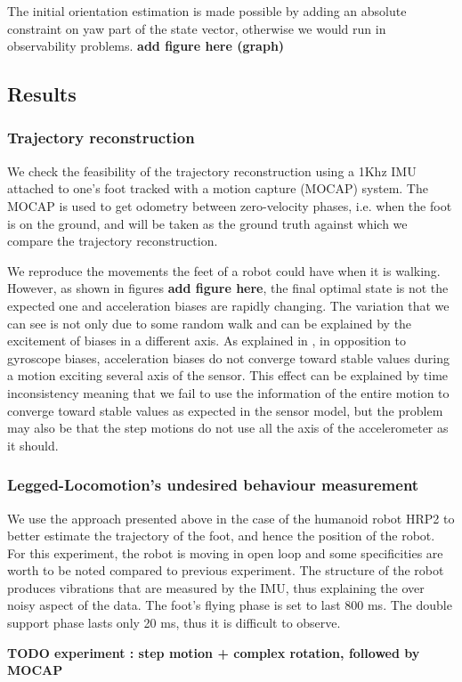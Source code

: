 The initial orientation estimation is made possible by adding an absolute constraint on yaw part of the state vector, otherwise we would run in observability problems. \textbf{add figure here (graph)}

\subsection{Results}
\subsubsection{Trajectory reconstruction}

We check the feasibility of the trajectory reconstruction using a 1Khz IMU attached to one's foot tracked with a motion capture (MOCAP) system. The MOCAP is used to get odometry between zero-velocity phases, i.e. when the foot is on the ground,
and will be taken as the ground truth against which we compare the trajectory reconstruction.

We reproduce the movements the feet of a robot could have when it is walking. However, as shown in figures \textbf{add figure here}, the final optimal state
is not the expected one and acceleration biases are rapidly changing. The variation that we can see is not only due to some random walk and can be explained by the excitement of biases in a different axis.
As explained in \cite{roussillon2011rt}, in opposition to gyroscope biases, acceleration biases do not converge toward stable values during a motion exciting several axis of the sensor. 
This effect can be explained by time inconsistency meaning that we fail
to use the information of the entire motion to converge toward stable values as expected in the sensor model, but the problem may also be that the step motions do not use all the axis of the accelerometer as it should.

\subsubsection{Legged-Locomotion's undesired behaviour measurement}

We use the approach presented above in the case of the humanoid robot HRP2 to better estimate the trajectory of the foot, and hence the position of the robot. For this experiment, the robot is moving in open loop and some specificities are worth to be
noted compared to previous experiment. The structure of the robot produces vibrations that are measured by the IMU, thus explaining the over noisy aspect of the data. The foot's flying phase is set to last 800 ms. The double support phase lasts only 20 ms,
thus it is difficult to observe.




\textbf{TODO experiment : step motion + complex rotation, followed by MOCAP}


